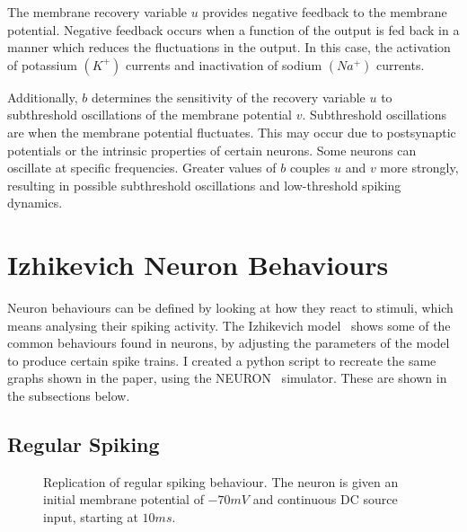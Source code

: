 \documentclass[12pt]{scrreprt}
\begin{document}
The membrane recovery variable $u$ provides negative feedback to the membrane potential. 
Negative feedback occurs when a function of the output is fed back in a manner which reduces the fluctuations in the output. 
In this case, the activation of potassium $(K^+)$ currents and inactivation of sodium $(Na^+)$ currents. 

Additionally, $b$ determines the sensitivity of the recovery variable $u$ to subthreshold oscillations of the membrane potential $v$.
Subthreshold oscillations are when the membrane potential fluctuates. 
This may occur due to postsynaptic potentials or the intrinsic properties of certain neurons. 
Some neurons can oscillate at specific frequencies. 
Greater values of $b$ couples $u$ and $v$ more strongly, resulting in possible subthreshold oscillations and low-threshold spiking dynamics.

\section{Izhikevich Neuron Behaviours}
\label{sec:behaviours}
Neuron behaviours can be defined by looking at how they react to stimuli, which means analysing their spiking activity. 
The Izhikevich model~\cite{izhikevich2003simple} shows some of the common behaviours found in neurons, by adjusting the parameters of the model to produce certain spike trains. 
I created a python script to recreate the same graphs shown in the paper, using the NEURON~\cite{hines1997neuron} simulator.
These are shown in the subsections below.

\subsection{Regular Spiking}
\label{subsec:RS}
\begin{figure}[H]
\centering
{}
\caption{Replication of regular spiking behaviour.
The neuron is given an initial membrane potential of $-70mV$ and continuous DC source input, starting at $10ms$.}
\label{fig:RS}
\end{figure} 
\end{document}
